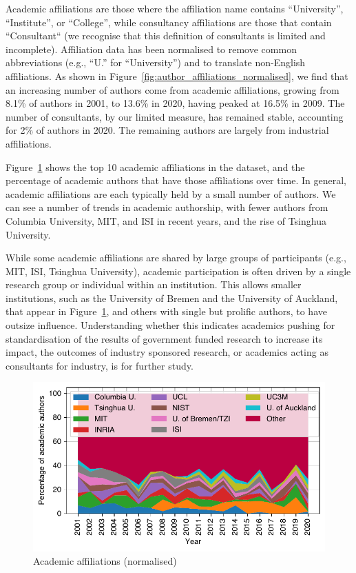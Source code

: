 \documentclass[twocolumn,10pt]{article}
\newlength{\figureWidthOneColumn}
\newcommand{\pb}[1]{\vspace{0.75ex}\noindent{\textbf{#1}}}
\begin{document}
\pb{Academia and consultants:}
Academic affiliations are those where the affiliation name contains
``University'', ``Institute'', or ``College'', while consultancy
affiliations are those that contain ``Consultant`` (we recognise that this
definition of consultants is limited and incomplete). Affiliation data has
been normalised to remove common abbreviations (e.g., ``U.'' for
``University'') and to translate non-English affiliations.  As shown in
Figure~\ref{fig:author_affiliations_normalised}, we find that an increasing
number of authors come from academic affiliations, growing from 8.1\% of
authors in 2001, to 13.6\% in 2020, having peaked at 16.5\% in 2009. The
number of consultants, by our limited measure, has remained stable,
accounting for 2\% of authors in 2020.  The remaining authors are largely
from industrial affiliations.

Figure~\ref{fig:author_affiliations_normalised_acad} shows the top 10
academic affiliations in the dataset, and the percentage of academic
authors that have those affiliations over time. In general, academic
affiliations are each typically held by a small number of authors. We can
see a number of trends in academic authorship, with fewer authors from
Columbia University, MIT, and ISI in recent years, and the rise of Tsinghua
University.

While some academic affiliations are shared by large groups of participants
(e.g., MIT, ISI, Tsinghua University), academic participation is often
driven by a single research group or individual within an institution.
This allows smaller institutions, such as the University of Bremen and
the University of Auckland, that appear in Figure~\ref{fig:author_affiliations_normalised_acad},
and others with single but prolific authors, to have outsize influence.
Understanding whether this indicates academics pushing for standardisation
of the results of government funded research to increase its impact, the
outcomes of industry sponsored research, or academics acting as consultants
for industry, is for further study.

\begin{figure}
  \centering
  \includegraphics[width=\figureWidthOneColumn]{figures-prev/imc-2021/authors/top5_affiliations_normalised_acad.pdf}
  \caption{
    Academic affiliations (normalised)
  }
  \label{fig:author_affiliations_normalised_acad}
\end{figure}
\end{document}
